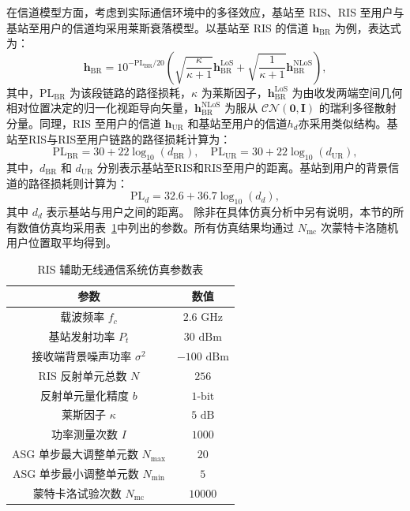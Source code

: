 在信道模型方面，考虑到实际通信环境中的多径效应，基站至 RIS、RIS 至用户与基站至用户的信道均采用莱斯衰落模型。以基站至 RIS 的信道 $\bm{h}_\mathrm{BR}$ 为例，表达式为：
\begin{equation}
	\bm{h}_\mathrm{BR} = 10^{-\mathrm{PL}_\mathrm{BR}/20} \left( \sqrt{\frac{\kappa}{\kappa+1}} \bm{h}_\mathrm{BR}^{\mathrm{LoS}} + \sqrt{\frac{1}{\kappa+1}} \bm{h}_\mathrm{BR}^{\mathrm{NLoS}} \right),
\end{equation}
其中，$\mathrm{PL}_\mathrm{BR}$ 为该段链路的路径损耗，$\kappa$ 为莱斯因子，$\bm{h}_\mathrm{BR}^{\mathrm{LoS}}$ 为由收发两端空间几何相对位置决定的归一化视距导向矢量，$\bm{h}_\mathrm{BR}^{\mathrm{NLoS}}$ 为服从 $\mathcal{CN}(\bm{0}, \bm{I})$ 的瑞利多径散射分量。同理，RIS 至用户的信道 $\bm{h}_\mathrm{UR}$ 和基站至用户的信道$h_d$亦采用类似结构。基站至RIS与RIS至用户链路的路径损耗计算为\cite{ren2023configuring, abeywickrama2020intelligent, jiang2021learning}：
\begin{equation}
	\mathrm{PL}_\mathrm{BR} = 30 + 22\log_{10}(d_\mathrm{BR}),\quad
	\mathrm{PL}_\mathrm{UR} = 30 + 22\log_{10}(d_\mathrm{UR}),
\end{equation}
其中，$d_\mathrm{BR}$ 和 $d_\mathrm{UR}$ 分别表示基站至RIS和RIS至用户的距离。基站到用户的背景信道的路径损耗则计算为：
\begin{equation}
	\mathrm{PL}_d = 32.6 + 36.7\log_{10}(d_d),
\end{equation}
其中 $d_d$ 表示基站与用户之间的距离。
除非在具体仿真分析中另有说明，本节的所有数值仿真均采用表~\ref{tab:ris_sim_params}中列出的参数。所有仿真结果均通过 $N_{\mathrm{mc}}$ 次蒙特卡洛随机用户位置取平均得到。

\begin{table}[!htbp]
	\centering
	\caption{RIS 辅助无线通信系统仿真参数表}
	\label{tab:ris_sim_params}
	\begin{tabular}{cc}
		\toprule
		\textbf{参数} & \textbf{数值} \\
		\midrule
		载波频率 $f_c$ & $2.6 \text{ GHz}$ \\
		基站发射功率 $P_t$ & $30 \text{ dBm}$ \\
		接收端背景噪声功率 $\sigma^2$ & $-100 \text{ dBm}$ \\
		RIS 反射单元总数 $N$ & $256$ \\
		反射单元量化精度 $b$ & $1 \text{-bit}$ \\
		莱斯因子 $\kappa$ & $5 \text{ dB}$ \\
		功率测量次数 $I$ & $1000$ \\
		ASG 单步最大调整单元数 $N_{\max}$ & $20$ \\
		ASG 单步最小调整单元数 $N_{\min}$ & $5$ \\
		蒙特卡洛试验次数 $N_{\mathrm{mc}}$ & $10000$ \\
		\bottomrule
	\end{tabular}
\end{table}

